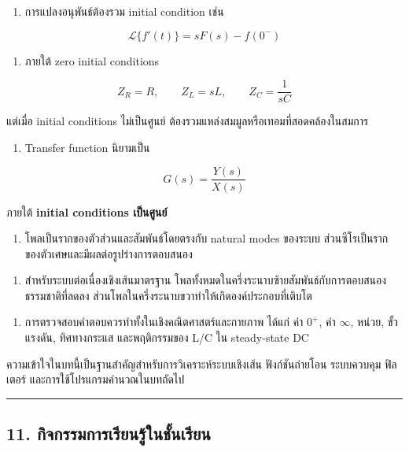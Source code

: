 \begin{enumerate}
    \item การแปลงอนุพันธ์ต้องรวม initial condition เช่น
\end{enumerate}

\[
\mathcal{L}\{f'(t)\}=sF(s)-f(0^-)
\]

\begin{enumerate}
    \item ภายใต้ zero initial conditions
\end{enumerate}

\[
Z_R=R,\qquad Z_L=sL,\qquad Z_C=\frac{1}{sC}
\]

แต่เมื่อ initial conditions ไม่เป็นศูนย์ ต้องรวมแหล่งสมมูลหรือเทอมที่สอดคล้องในสมการ

\begin{enumerate}
    \item Transfer function นิยามเป็น
\end{enumerate}

\[
G(s)=\frac{Y(s)}{X(s)}
\]

ภายใต้ \textbf{initial conditions เป็นศูนย์}

\begin{enumerate}
    \item โพลเป็นรากของตัวส่วนและสัมพันธ์โดยตรงกับ natural modes ของระบบ ส่วนซีโรเป็นรากของตัวเศษและมีผลต่อรูปร่างการตอบสนอง
\end{enumerate}

\begin{enumerate}
    \item สำหรับระบบต่อเนื่องเชิงเส้นมาตรฐาน โพลทั้งหมดในครึ่งระนาบซ้ายสัมพันธ์กับการตอบสนองธรรมชาติที่ลดลง ส่วนโพลในครึ่งระนาบขวาทำให้เกิดองค์ประกอบที่เติบโต
\end{enumerate}

\begin{enumerate}
    \item การตรวจสอบคำตอบควรทำทั้งในเชิงคณิตศาสตร์และกายภาพ ได้แก่ ค่า $0^+$, ค่า $\infty$, หน่วย, ขั้วแรงดัน, ทิศทางกระแส และพฤติกรรมของ L/C ใน steady-state DC
\end{enumerate}

ความเข้าใจในบทนี้เป็นฐานสำคัญสำหรับการวิเคราะห์ระบบเชิงเส้น ฟังก์ชันถ่ายโอน ระบบควบคุม ฟิลเตอร์ และการใช้โปรแกรมคำนวณในบทถัดไป

\par\noindent\rule{\textwidth}{0.4pt}\par

\subsection{11. กิจกรรมการเรียนรู้ในชั้นเรียน}

